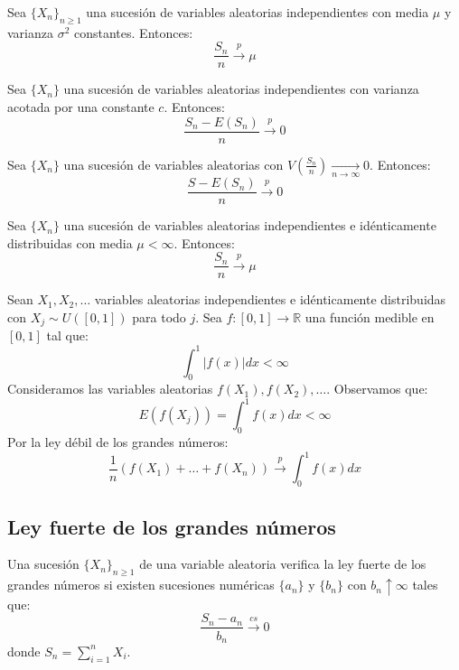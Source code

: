 \begin{theorem}[Chebyshev]
    Sea $\{X_n\}_{n \geq 1}$ una sucesión de variables aleatorias independientes con media $\mu$ y varianza $\sigma^2$ constantes.
    Entonces:
    $$\frac{S_n}{n} \xrightarrow{p} \mu$$
\end{theorem}

\begin{theorem}[Chebyshev]
    Sea $\{X_n\}$ una sucesión de variables aleatorias independientes con varianza acotada por una constante $c$.
    Entonces:
    $$\frac{S_n - E(S_n)}{n} \xrightarrow{p} 0$$
\end{theorem}

\begin{theorem}[Márkov]
    Sea $\{X_n\}$ una sucesión de variables aleatorias con $V\left(\frac{S_n}{n}\right) \xrightarrow[n \to \infty]{} 0$.
    Entonces:
    $$\frac{S - E(S_n)}{n} \xrightarrow{p} 0$$
\end{theorem}

\begin{theorem}[Khinchin]
    Sea $\{X_n\}$ una sucesión de variables aleatorias independientes e idénticamente distribuidas con media $\mu < \infty$.
    Entonces:
    $$\frac{S_n}{n} \xrightarrow{p} \mu$$
\end{theorem}

\begin{example}
    Sean $X_1, X_2, \dots$ variables aleatorias independientes e idénticamente distribuidas con $X_j \sim U([0, 1])$ para todo $j$.
    Sea $f: [0, 1] \to \mathbb{R}$ una función medible en $[0, 1]$ tal que:
    $$\int_0^1 |f(x)|dx < \infty$$
    Consideramos las variables aleatorias $f(X_1), f(X_2), \dots$.
    Observamos que:
    $$E(f(X_j)) = \int_0^1 f(x)dx < \infty$$
    Por la ley débil de los grandes números:
    $$\frac{1}{n}(f(X_1) + \dots + f(X_n)) \xrightarrow{p} \int_0^1 f(x)dx$$
\end{example}


\subsection*{Ley fuerte de los grandes números}
\begin{definition}
    Una sucesión $\{X_n\}_{n \geq 1}$ de una variable aleatoria verifica la ley fuerte de los grandes números si existen sucesiones numéricas $\{a_n\}$ y $\{b_n\}$ con $b_n \uparrow \infty$ tales que:
    $$\frac{S_n - a_n}{b_n} \xrightarrow{cs} 0$$
    donde $S_n = \sum_{i=1}^n X_i$.
\end{definition}

